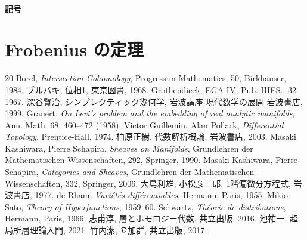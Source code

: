 \paragraph{記号}
\section{Frobenius の定理}

\begin{thebibliography}{20} 
     Borel, 
        \textit{Intersection Cohomology}, 
        Progress in Mathematics, 50, Birkh\"auser, 1984.
     ブルバキ, 位相1, 東京図書, 1968.
     Grothendieck, EGA IV, Pub. IHES., 32 1967.
     深谷賢治, シンプレクティック幾何学, 岩波講座 現代数学の展開 岩波書店, 1999.
     Grauert, 
        \textit{On Levi's problem and the embedding of real analytic manifolds}, 
        Ann. Math. 68, 460--472 (1958).
     Victor Guillemin, Alan Pollack, 
        \textit{Differential Topology}, 
        Prentice-Hall, 1974.
     柏原正樹, 代数解析概論, 岩波書店, 2003.
     Masaki Kashiwara, Pierre Schapira, 
        \textit{Sheaves on Manifolds}, 
        Grundlehren der Mathematischen Wissenschaften, 292, Springer, 1990.
     Masaki Kashiwara, Pierre Schapira, 
        \textit{Categories and Sheaves}, 
        Grundlehren der Mathematischen Wissenschaften, 332, Springer, 2006.
      大島利雄, 小松彦三郎, 1階偏微分方程式, 岩波書店, 1977.
     de Rham, 
        \textit{Vari\'et\'es diff\'erentiables}, 
        Hermann, Paris, 1955.
     Mikio Sato, 
        \textit{Theory of Hyperfunctions}, 
        1959--60.
     Schwartz, 
        \textit{Th\'eorie de distributions}, 
        Hermann, Paris, 1966.
     志甫淳, 層とホモロジー代数, 共立出版, 2016.
     池祐一, 超局所層理論入門, 2021.
     竹内潔, \(\mathcal{D}\)加群, 共立出版, 2017.
\end{thebibliography}




